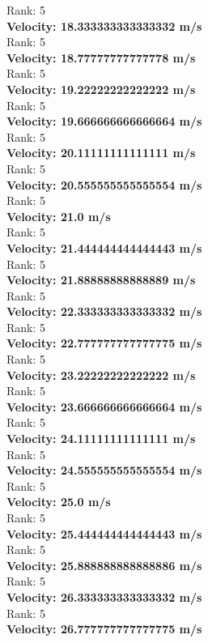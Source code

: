 \documentclass{article}
\begin{document}
Rank: 5\\
\textbf{Velocity: 18.333333333333332 m/s}\\
Rank: 5\\
\textbf{Velocity: 18.77777777777778 m/s}\\
Rank: 5\\
\textbf{Velocity: 19.22222222222222 m/s}\\
Rank: 5\\
\textbf{Velocity: 19.666666666666664 m/s}\\
Rank: 5\\
\textbf{Velocity: 20.11111111111111 m/s}\\
Rank: 5\\
\textbf{Velocity: 20.555555555555554 m/s}\\
Rank: 5\\
\textbf{Velocity: 21.0 m/s}\\
Rank: 5\\
\textbf{Velocity: 21.444444444444443 m/s}\\
Rank: 5\\
\textbf{Velocity: 21.88888888888889 m/s}\\
Rank: 5\\
\textbf{Velocity: 22.333333333333332 m/s}\\
Rank: 5\\
\textbf{Velocity: 22.777777777777775 m/s}\\
Rank: 5\\
\textbf{Velocity: 23.22222222222222 m/s}\\
Rank: 5\\
\textbf{Velocity: 23.666666666666664 m/s}\\
Rank: 5\\
\textbf{Velocity: 24.11111111111111 m/s}\\
Rank: 5\\
\textbf{Velocity: 24.555555555555554 m/s}\\
Rank: 5\\
\textbf{Velocity: 25.0 m/s}\\
Rank: 5\\
\textbf{Velocity: 25.444444444444443 m/s}\\
Rank: 5\\
\textbf{Velocity: 25.888888888888886 m/s}\\
Rank: 5\\
\textbf{Velocity: 26.333333333333332 m/s}\\
Rank: 5\\
\textbf{Velocity: 26.777777777777775 m/s}\\
\end{document}
